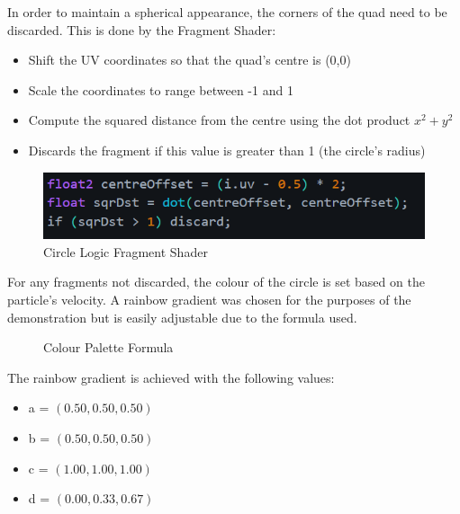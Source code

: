 \documentclass[a4paper, 12pt]{article}
\newcommand{\wideimage}[2][]{%
  \makebox[\textwidth][c]{\texttt{[image: \#2]}}%
}
\begin{document}
    In order to maintain a spherical appearance, the corners of the quad need to be discarded. This is done by the Fragment Shader:
    
    \begin{itemize}
        \item Shift the UV coordinates so that the quad's centre is (0,0)
        \item Scale the coordinates to range between -1 and 1
        \item Compute the squared distance from the centre using the dot product $x^2 + y^2$
        \item Discards the fragment if this value is greater than 1 (the circle's radius)
    \end{itemize}

    \begin{figure}[H]
        \begin{center}
            \includegraphics[]{circleLogic.png}
            \caption{Circle Logic Fragment Shader \cite{lague2}}
        \end{center}
    \end{figure}

    For any fragments not discarded, the colour of the circle is set based on the particle's velocity. A rainbow gradient was chosen for the purposes of the demonstration but is easily adjustable due to the formula used\cite{colours}.

    \begin{figure}[H]
        \begin{center}
            \wideimage[]{paletteHelper.png}
            \caption{Colour Palette Formula \cite{colours}}
        \end{center}
    \end{figure}

    The rainbow gradient is achieved with the following values:
    \begin{itemize}
        \item a = $(0.50, 0.50, 0.50)$
        \item b = $(0.50, 0.50, 0.50)$
        \item c = $(1.00, 1.00, 1.00)$
        \item d = $(0.00, 0.33, 0.67)$
    \end{itemize}
\end{document}
